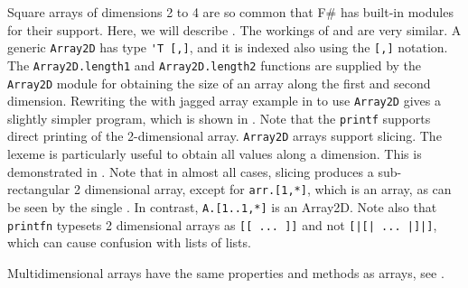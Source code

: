 \documentclass[springer.tex]{subfiles}
\begin{document}
Square arrays of dimensions 2 to 4 are so common that F\# has built-in modules for their support. Here, we will describe . The workings of  and  are very similar. A generic \lstinline{Array2D} has type \lstinline{'T [,]}, and it is indexed also using the \lstinline|[,]| notation. The \lstinline{Array2D.length1} and \lstinline{Array2D.length2} functions are supplied by the \lstinline{Array2D} module for obtaining the size of an array along the first and second dimension. Rewriting the with jagged array example in  to use \lstinline{Array2D} gives a slightly simpler program, which is shown in .
%
%
Note that the \lstinline!printf! supports direct printing of the 2-dimensional array. \lstinline{Array2D} arrays support slicing. The \lexeme{*} lexeme is particularly useful to obtain all values along a dimension. This is demonstrated in .
%
%
Note that in almost all cases, slicing produces a sub-rectangular 2 dimensional array, except for \lstinline{arr.[1,*]}, which is an array, as can be seen by the single \lexeme{[}. In contrast, \lstinline{A.[1..1,*]} is an Array2D. Note also that \lstinline!printfn! typesets 2 dimensional arrays as \lstinline{[[ ... ]]} and not \lstinline{[|[| ... |]|]}, which can cause confusion with lists of lists.

Multidimensional arrays have the same properties and methods as arrays, see .
\clearpage
\end{document}

